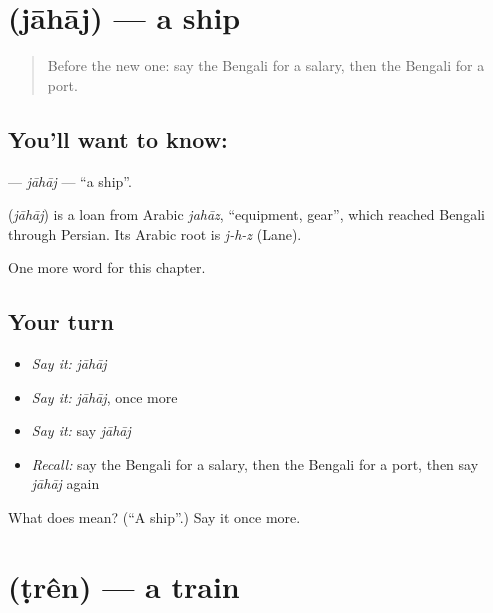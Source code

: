 \section[\texorpdfstring{\bn{জাহাজ} (jāhāj)}{জাহাজ (jāhāj)}]{ (jāhāj) — a ship}

\label{lesson:BN-C128-jahaj}



\begin{quote}
Before the new one: say the Bengali for a salary, then the Bengali for a port.
\end{quote}

\subsection*{You'll want to know: }
\textbf{} — \emph{jāhāj} — \textquotedblleft{}a ship\textquotedblright{}.

\begin{cousinweb}
\textbf{} (\emph{jāhāj}) is a loan from Arabic \emph{jahāz}, \textquotedblleft{}equipment, gear\textquotedblright{}, which reached Bengali through Persian. Its Arabic root is \emph{j-h-z} (Lane).
\end{cousinweb}

\begin{grammarlens}[title={What you've built}]
One more word for this chapter.
\end{grammarlens}

\subsection*{Your turn}
\begin{itemize}
\raggedright
  \item \emph{Say it:} \emph{jāhāj}
  \item \emph{Say it:} \emph{jāhāj}, once more
  \item \emph{Say it:} say \emph{jāhāj}
  \item \emph{Recall:} say the Bengali for a salary, then the Bengali for a port, then say \emph{jāhāj} again
\end{itemize}

\begin{tcolorbox}[breakable,colback=teal!4,colframe=teal!35!black,title={Before you move on}]
What does  mean? (\textquotedblleft{}A ship\textquotedblright{}.) Say it once more.
\end{tcolorbox}
\section[\texorpdfstring{\bn{ট্রেন} (ṭrên)}{ট্রেন (ṭrên)}]{ (ṭrên) — a train}

